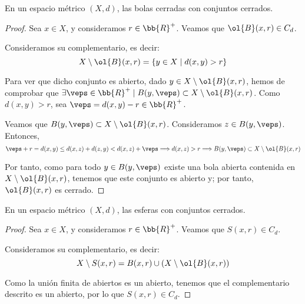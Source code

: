 \begin{prop}
    En un espacio métrico $(X,d)$, las bolas cerradas con conjuntos cerrados.
\end{prop}
\begin{proof}
    Sea $x\in X$, y consideramos $r\in \bb{R}^+$. Veamos que $\ol{B}(x,r)\in C_d$.

    Consideramos su complementario, es decir:
    \begin{equation*}
        X\setminus \ol{B}(x,r) = \{y\in X\mid d(x,y)>r\}
    \end{equation*}

    Para ver que dicho conjunto es abierto, dado $y\in X\setminus \ol{B}(x,r)$, hemos de comprobar que $\exists \veps\in \bb{R}^+\mid B(y,\veps)\subset X\setminus \ol{B}(x,r)$. Como $d(x,y)>r$, sea $\veps=d(x,y)-r\in \bb{R}^+$. 
    
    Veamos que $B(y,\veps)\subset X\setminus \ol{B}(x,r)$. Consideramos $z\in B(y,\veps)$. Entonces,
    \begin{equation*}
        \veps+r = d(x,y)\leq d(x,z)+d(z,y) < d(x,z)+\veps \Longrightarrow d(x,z)>r \Longrightarrow B(y,\veps)\subset X\setminus \ol{B}(x,r)
    \end{equation*}
    
    
    Por tanto, como para todo $y\in B(y,\veps)$ existe una bola abierta contenida en $X\setminus \ol{B}(x,r)$, tenemos que este conjunto es abierto y; por tanto, $\ol{B}(x,r)$ es cerrado.
\end{proof}

\begin{coro}
    En un espacio métrico $(X,d)$, las esferas con conjuntos cerrados.
\end{coro}
\begin{proof}
    Sea $x\in X$, y consideramos $r\in \bb{R}^+$. Veamos que $S(x,r)\in C_d$.

    Consideramos su complementario, es decir:
    \begin{equation*}
        X\setminus S(x,r) = B(x,r)\cup \left(X\setminus \ol{B}(x,r)\right)
    \end{equation*}

    Como la unión finita de abiertos es un abierto, tenemos que el complementario descrito es un abierto, por lo que $S(x,r)\in C_d$.
\end{proof}


